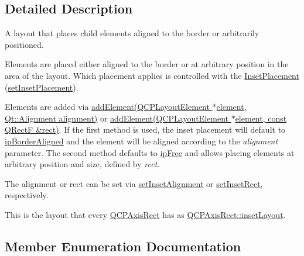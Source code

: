 \subsection{Detailed Description}
A layout that places child elements aligned to the border or arbitrarily positioned. 

Elements are placed either aligned to the border or at arbitrary position in the area of the layout. Which placement applies is controlled with the \hyperlink{class_q_c_p_layout_inset_a8b9e17d9a2768293d2a7d72f5e298192}{Inset\+Placement} (\hyperlink{class_q_c_p_layout_inset_a63298830744d5d8c5345511c00fd2144}{set\+Inset\+Placement}).

Elements are added via \hyperlink{class_q_c_p_layout_inset_ad61529eb576af7f04dff94abb10c745a}{add\+Element(\+Q\+C\+P\+Layout\+Element $\ast$element, Qt\+::\+Alignment alignment)} or \hyperlink{class_q_c_p_layout_inset_a8ff61fbee4a1f0ff45c398009d9f1e56}{add\+Element(\+Q\+C\+P\+Layout\+Element $\ast$element, const Q\+Rect\+F \&rect)}. If the first method is used, the inset placement will default to \hyperlink{class_q_c_p_layout_inset_a8b9e17d9a2768293d2a7d72f5e298192aa81e7df4a785ddee2229a8f47c46e817}{ip\+Border\+Aligned} and the element will be aligned according to the {\itshape alignment} parameter. The second method defaults to \hyperlink{class_q_c_p_layout_inset_a8b9e17d9a2768293d2a7d72f5e298192aa4802986ea2cea457f932b115acba59e}{ip\+Free} and allows placing elements at arbitrary position and size, defined by {\itshape rect}.

The alignment or rect can be set via \hyperlink{class_q_c_p_layout_inset_a62882a4f9ad58bb0f53da12fde022abe}{set\+Inset\+Alignment} or \hyperlink{class_q_c_p_layout_inset_aa487c8378a6f9533567a2e6430099dc3}{set\+Inset\+Rect}, respectively.

This is the layout that every \hyperlink{class_q_c_p_axis_rect}{Q\+C\+P\+Axis\+Rect} has as \hyperlink{class_q_c_p_axis_rect_a949f803466619924c7018df4b511ae10}{Q\+C\+P\+Axis\+Rect\+::inset\+Layout}. 

\subsection{Member Enumeration Documentation}
\hypertarget{class_q_c_p_layout_inset_a8b9e17d9a2768293d2a7d72f5e298192}{}\label{class_q_c_p_layout_inset_a8b9e17d9a2768293d2a7d72f5e298192} 
